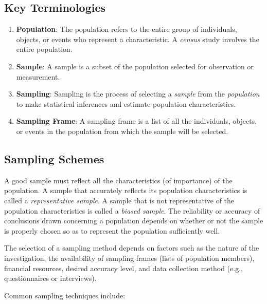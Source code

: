 \documentclass{article}
\begin{document}
\subsection{Key Terminologies}
\begin{enumerate}
    \item \textbf{Population}: The population refers to the entire group of individuals, objects, or events who represent a characteristic. A \textit{census} study involves the entire population.

    \item \textbf{Sample}: A sample is a subset of the population selected for observation or measurement.

    \item \textbf{Sampling}: Sampling is the process of selecting a \textit{sample} from the \textit{population} to make statistical inferences and estimate population characteristics.

    \item \textbf{Sampling Frame}: A sampling frame is a list of all the individuals, objects, or events in the population from which the sample will be selected.
\end{enumerate}

\subsection{Sampling Schemes}

A good sample must reflect all the characteristics (of importance) of the population. A sample that accurately reflects its population characteristics is called a \textit{representative sample}. A sample that is not representative of the population characteristics is called a \textit{biased sample}. The reliability or accuracy of conclusions drawn concerning a population depends on whether or not the sample is properly chosen so as to represent the population sufficiently well. \cite{stats_applications}

\noindent The selection of a sampling method depends on factors such as the nature of the investigation, the availability of sampling frames (lists of population members), financial resources, desired accuracy level, and data collection method (e.g., questionnaires or interviews).

\noindent Common sampling techniques include:
\end{document}
